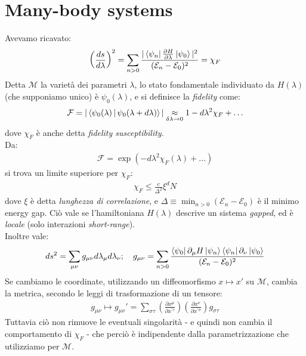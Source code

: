 \documentclass[../../InformazioneQuantistica.tex]{subfiles}
\begin{document}
\section{Many-body systems}

Avevamo ricavato:
\begin{align*}
\left(\frac{ds}{d\lambda}\right)^2 = \sum_{n>0} \frac{|\Bra{\psi_n}\frac{\partial H}{\partial \lambda} \Ket{\psi_0}|^2}{(\mathcal{E}_n - \mathcal{E}_0)^2} = \chi_F
\end{align*}
Detta $\mathcal{M}$ la varietà dei parametri $\lambda$, lo stato fondamentale individuato da $H(\lambda)$ (che supponiamo unico) è $\psi_0(\lambda)$, e si definisce la \textit{fidelity} come:
\begin{align*}
\mathcal{F} = |\Braket{\psi_0(\lambda)|\psi_0(\lambda+d\lambda)}|\underset{\delta \lambda \to 0}{\approx} 1 - d\lambda^2 \chi_F + \dots
\end{align*}
dove $\chi_F$ è anche detta \textit{fidelity susceptibility}.\\
Da:
\begin{align*}
\mathcal{F} = \exp(-d \lambda^2 \chi_F(\lambda) + \dots )
\end{align*}
si trova un limite superiore per $\chi_F$:
\begin{align*}
\chi_F \leq \frac{c}{\Delta^2} \xi^d N
\end{align*}
dove $\xi$ è detta \textit{lunghezza di correlazione}, e $\Delta \equiv \min_{n>0} (\mathcal{E}_n-\mathcal{E}_0)$ è il minimo energy gap. Ciò vale se l'hamiltoniana $H(\lambda)$ descrive un sistema \textit{gapped}, ed è \textit{locale} (solo interazioni \textit{short-range}).\\

Inoltre vale:
\begin{align*}
ds^2 = \sum_{\mu\nu} g_{\mu\nu} d\lambda_\mu d\lambda_\nu; \quad g_{\mu\nu} = \sum_{n>0} \frac{\Bra{\psi_0}\partial_\mu H \Ket{\psi_n}\Bra{\psi_n}\partial_\nu\Ket{\psi_0}}{(\mathcal{E}_n-\mathcal{E}_0)^2}
\end{align*}
Se cambiamo le coordinate, utilizzando un diffeomorfismo $x\mapsto x'$ su $\mathcal{M}$, cambia la metrica, secondo le leggi di trasformazione di un tensore:
\begin{align*}
g_{\mu\nu} \mapsto g_{\mu\nu}' = \sum_{\sigma \tau} \left(\frac{\partial x^\mu}{\partial x^{'\tau}}\right) \left(\frac{\partial x^\nu}{\partial x^{'\sigma}}\right) g_{\sigma\tau}
\end{align*}
Tuttavia ciò non rimuove le eventuali singolarità - e quindi non cambia il comportamento di $\chi_F$ - che perciò è indipendente dalla parametrizzazione che utilizziamo per $\mathcal{M}$.\\
\end{document}

